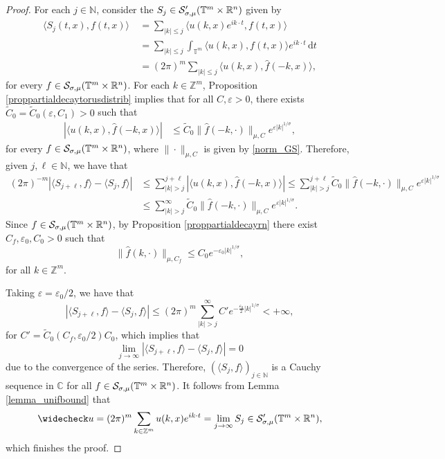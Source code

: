 \documentclass[11pt,reqno]{amsart}
\numberwithin{equation}{section}
\theoremstyle{definition}
\theoremstyle{definition}
\newcommand{\T}{\mathbb{T}}
\newcommand{\G}{\mathnormal{\mathbb{T}^{m}\times\mathbb{R}^n}}
\newcommand{\Z}{\mathbb{Z}}
\newcommand{\N}{\mathbb{N}}
\renewcommand{\S}{\mathcal{S}_{\sigma,\mu}(\G)}
\renewcommand{\SS}{\mathcal{S}'_{\sigma,\mu}(\G)}
\begin{document}
    \begin{proof}
        For each $j\in\N$, consider the  $S_j\in\SS$ given by
        \begin{align*}
    \langle S_j(t,x),f(t,x)\rangle\ & = \sum_{|k|\leq j}\langle  u(k,x)e^{ik\cdot t},f(t,x)\rangle\\
    & = \sum_{|k|\leq j}\int_{\T^m}\langle u(k,x),f(t,x)\rangle e^{ik\cdot t}\,\mathrm{d}t  \\
    & = (2\pi)^m\sum_{|k|\leq j}\langle u(k,x),\widehat{f}(-k,x)\rangle,
    \end{align*}
    for every $f\in\S$. For each $k\in\Z^m$,  Proposition \ref{proppartialdecaytorusdistrib} implies that for all $C,\varepsilon>0$, there exists $\tilde C_0=\tilde C_0(\varepsilon,C_1)>0$ such that
    \begin{align*}
    |\langle {u}(k,x),\widehat{f}(-k,x)\rangle|&\leq  \tilde C_0\|\widehat{f}(-k,\cdot)\|_{\mu,C}e^{\varepsilon|k|^{1/\sigma}},
    \end{align*}
    for every $f\in \S$, where $\|\cdot\|_{\mu,C}$ is given by \eqref{norm_GS}. Therefore, given $j,\ell\in\N$, we have that 
    \begin{align*}
    (2\pi)^{-m}|\langle S_{j+\ell},f \rangle - \langle S_{j},f\rangle|&\leq \sum_{|k|>j}^{j+\ell} |\langle {u}(k,x),\widehat{f}(-k,x)\rangle|\leq \sum_{|k|>j}^{j+\ell}\tilde C_0\|\widehat{f}(-k,\cdot)\|_{\mu,C}e^{\varepsilon|k|^{1/\sigma}}\\
    &\leq \sum_{|k|>j}^{\infty} \tilde C_0\|\widehat{f}(-k,\cdot)\|_{\mu,C}e^{\varepsilon|k|^{1/\sigma}}.
    \end{align*}
   Since $f\in\S$, by Proposition \ref{proppartialdecayrn} there exist $C_f,\varepsilon_0,C_0>0$ such that
    \[\|\widehat{f}(k,\cdot)\|_{\mu,C_f}\leq C_0 e^{-\varepsilon_0|k|^{1/\sigma}},\]
for all $k\in\Z^m$.

    Taking $\varepsilon=\varepsilon_0/2$, we have that
    \[|\langle S_{j+\ell},f \rangle - \langle S_{j},f\rangle|\leq (2\pi)^m\sum_{|k|>j}^{\infty} C'e^{-\frac{\varepsilon_0}{2}|k|^{1/\sigma}}<+\infty,\]
    for $C'=\tilde{C}_0(C_f,\varepsilon_0/2)C_0$, which implies that
    \[\lim_{j\to\infty}|\langle S_{j+\ell},f \rangle - \langle S_{j},f\rangle| = 0\]
    due to the convergence of the series. Therefore, $(\langle S_j,f\rangle)_{j\in\N}$ is a Cauchy sequence in $\mathbb{C}$ for all $f\in\S$. It follows from Lemma \ref{lemma_unifbound} that
    \[\widecheck u = (2\pi)^m\sum_{k\in\Z^m}u(k,x)e^{ik\cdot t} = \lim_{j\to\infty}S_j\in\SS,\] 
    which finishes the proof.
    \end{proof}
\end{document}
